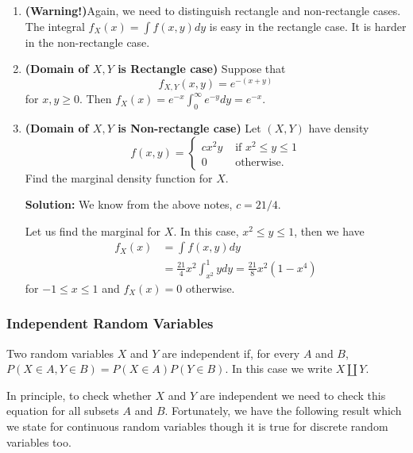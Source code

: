 \documentclass[13pt]{article}
\theoremstyle{definition}
\newenvironment{solution}
{\color{C2}\begin{framed}\begingroup\textbf{Solution:} }
  {\endgroup\end{framed}}
\theoremstyle{remark}
\newenvironment{remark}
  {\pushQED{\qed}\renewcommand{\qedsymbol}{$\triangle$}\remarkx}
  {\popQED\endremarkx}
\begin{document}
\begin{remark}\hfill 
\begin{enumerate}
    \item \textbf{(Warning!)}Again, we need to distinguish rectangle and non-rectangle cases. The integral $f_{X}(x)=\int f(x, y) d y$ is easy in the rectangle case. It is harder in the non-rectangle case. 
    \item \textbf{(Domain of $X, Y$ is Rectangle case)} Suppose that
$$
f_{X, Y}(x, y)=e^{-(x+y)}
$$
for $x, y \geq 0$. Then $f_{X}(x)=e^{-x} \int_{0}^{\infty} e^{-y} d y=e^{-x}$.
\item \textbf{(Domain of $X, Y$ is Non-rectangle case)} Let $(X, Y)$ have density
$$
f(x, y)= \begin{cases}c x^{2} y & \text { if } x^{2} \leq y \leq 1 \\ 0 & \text { otherwise. }\end{cases}
$$
Find the marginal density function for $X$.
\begin{solution}
We know from the above notes, $c=21 / 4$. 

Let us find the marginal for $X$. In this case, $x^{2} \leq y \leq 1$, then we have
$$
\begin{aligned}
f_{X}(x) & =\int f(x, y) d y \\
& =\frac{21}{4} x^{2} \int_{x^{2}}^{1} y d y=\frac{21}{8} x^{2}\left(1-x^{4}\right)
\end{aligned}
$$
for $-1 \leq x \leq 1$ and $f_{X}(x)=0$ otherwise.
\end{solution}
\end{enumerate}
\end{remark}

\subsubsection{Independent Random Variables}
Two random variables $X$ and $Y$ are independent if, for every $A$ and $B$, $P(X \in A, Y \in B)=P(X \in A) P(Y \in B)$. In this case we write $X \amalg Y$. 

In principle, to check whether $X$ and $Y$ are independent we need to check this equation for all subsets $A$ and $B$. Fortunately, we have the following result which we state for continuous random variables though it is true for discrete random variables too.
\end{document}
